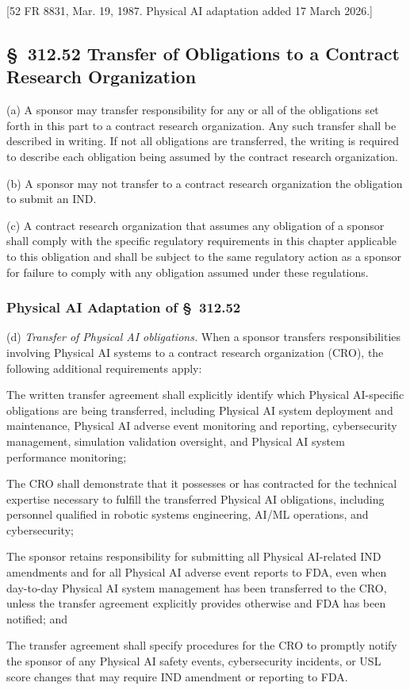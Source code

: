\documentclass[11pt]{article}
\begin{document}
[52 FR 8831, Mar. 19, 1987. Physical AI adaptation added 17 March 2026.]

\subsection{\S~312.52 Transfer of Obligations to a Contract Research Organization}

(a) A sponsor may transfer responsibility for any or all of the obligations set forth in this part to a contract research organization. Any such transfer shall be described in writing. If not all obligations are transferred, the writing is required to describe each obligation being assumed by the contract research organization.

(b) A sponsor may not transfer to a contract research organization the obligation to submit an IND.

(c) A contract research organization that assumes any obligation of a sponsor shall comply with the specific regulatory requirements in this chapter applicable to this obligation and shall be subject to the same regulatory action as a sponsor for failure to comply with any obligation assumed under these regulations.

\subsubsection{Physical AI Adaptation of \S~312.52}

(d) \textit{Transfer of Physical AI obligations.} When a sponsor transfers responsibilities involving Physical AI systems to a contract research organization (CRO), the following additional requirements apply:

\begin{description}[leftmargin=0.8cm,style=sameline]
\item[(i)] The written transfer agreement shall explicitly identify which Physical AI-specific obligations are being transferred, including Physical AI system deployment and maintenance, Physical AI adverse event monitoring and reporting, cybersecurity management, simulation validation oversight, and Physical AI system performance monitoring;
\item[(ii)] The CRO shall demonstrate that it possesses or has contracted for the technical expertise necessary to fulfill the transferred Physical AI obligations, including personnel qualified in robotic systems engineering, AI/ML operations, and cybersecurity;
\item[(iii)] The sponsor retains responsibility for submitting all Physical AI-related IND amendments and for all Physical AI adverse event reports to FDA, even when day-to-day Physical AI system management has been transferred to the CRO, unless the transfer agreement explicitly provides otherwise and FDA has been notified; and
\item[(iv)] The transfer agreement shall specify procedures for the CRO to promptly notify the sponsor of any Physical AI safety events, cybersecurity incidents, or USL score changes that may require IND amendment or reporting to FDA.
\end{description}
\end{document}
